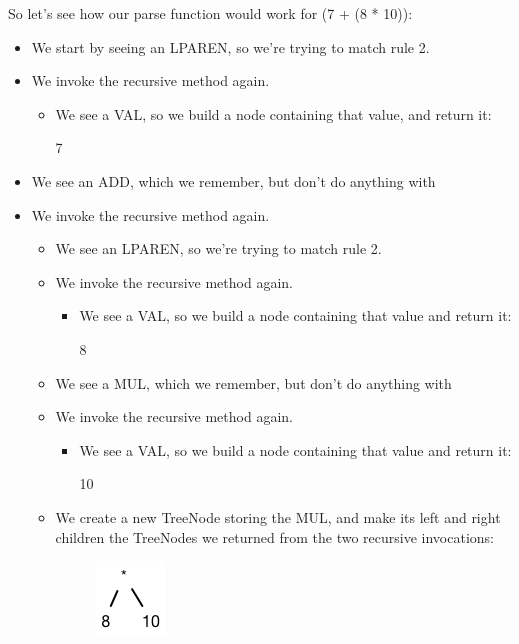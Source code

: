 \documentclass{article}
\begin{document}
So let's see how our parse function would work for \textsf{(7 + (8 * 10))}:
\begin{itemize}
\item    We start by seeing an \textsf{LPAREN}, so we're trying to match rule 2.
\item    We invoke the recursive method again.
\begin{itemize}
\item    We see a VAL, so we build a node containing that value, and return it:
	
	\textsf{7}

\end{itemize}
\item We see an \textsf{ADD}, which we remember, but don't do anything with
\item We invoke the recursive method again.
\begin{itemize}
\item  We see an \textsf{LPAREN}, so we're trying to match rule 2.
\item  We invoke the recursive method again.
\begin{itemize}
\item  We see a \textsf{VAL}, so we build a node containing that value and return it:


8


\end{itemize}
\item We see a \textsf{MUL}, which we remember, but don't do anything with
\item We invoke the recursive method again.
\begin{itemize}
\item  We see a \textsf{VAL}, so we build a node containing that value and return it:
	

10


\end{itemize}
\item We create a new \textsf{TreeNode} storing the \textsf{MUL}, and make its left and right children the \textsf{TreeNode}s we returned from the two recursive invocations:

\begin{figure}[H]
\centering
\includegraphics[scale=0.5]{step4.png}
\end{figure}


\end{itemize}
\end{itemize}
\end{document}
